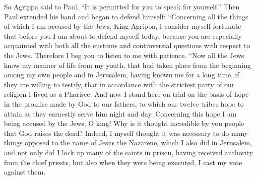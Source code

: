 \begin{biblechapter} %
 So Agrippa said to Paul, “It is permitted for you to speak for yourself.” Then Paul extended his hand and began to defend himself:
\verse “Concerning all the things of which I am accused by the Jews, King Agrippa, I consider myself fortunate that before you I am about to defend myself today,
\verse because you are especially acquainted with both all the customs and controversial questions with respect to the Jews. Therefore I beg you to listen to me with patience.
\verse “Now all the Jews know my manner of life from my youth, that had taken place from the beginning among my own people and in Jerusalem,
\verse having known me for a long time, if they are willing to testify, that in accordance with the strictest party of our religion I lived as a Pharisee.
\verse And now I stand here on trial on the basis of hope in the promise made by God to our fathers,
\verse to which our twelve tribes hope to attain as they earnestly serve him night and day. Concerning this hope I am being accused by the Jews, O king!
\verse Why is it thought incredible by you people that God raises the dead?
\verse Indeed, I myself thought it was necessary to do many things opposed to the name of Jesus the Nazarene,
\verse which I also did in Jerusalem, and not only did I lock up many of the saints in prison, having received authority from the chief priests, but also when they were being executed, I cast my vote against them.

\end{biblechapter}
